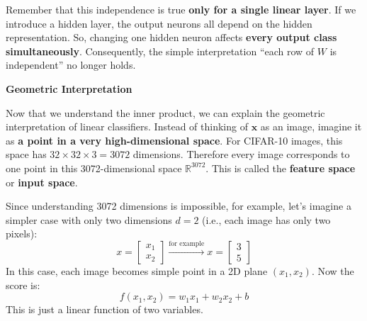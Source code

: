 \highspace
Remember that this independence is true \textbf{only for a single linear layer}. If we introduce a hidden layer, the output neurons all depend on the hidden representation. So, changing one hidden neuron affects \textbf{every output class simultaneously}. Consequently, the simple interpretation ``each row of $W$ is independent'' no longer holds.

\highspace
\begin{flushleft}
    \textcolor{Green3}{ \textbf{Geometric Interpretation}}
\end{flushleft}
Now that we understand the inner product, we can explain the geometric interpretation of linear classifiers. Instead of thinking of $\mathbf{x}$ as an image, imagine it as \textbf{a point in a very high-dimensional space}. For CIFAR-10 images, this space has $32 \times 32 \times 3 = 3072$ dimensions. Therefore every image corresponds to one point in this 3072-dimensional space $\mathbb{R}^{3072}$. This is called the \textbf{feature space} or \textbf{input space}.

\highspace
Since understanding 3072 dimensions is impossible, for example, let's imagine a simpler case with only two dimensions $d=2$ (i.e., each image has only two pixels):
\begin{equation*}
    x = \begin{bmatrix}
        x_1 \\
        x_2
    \end{bmatrix}
    \xrightarrow{\text{for example}}
    x = \begin{bmatrix}
        3 \\
        5
    \end{bmatrix}
\end{equation*}
In this case, each image becomes simple point in a 2D plane $\left(x_1, x_2\right)$. Now the score is:
\begin{equation*}
    f\left(x_1, x_2\right) = w_1 x_1 + w_2 x_2 + b
\end{equation*}
This is just a linear function of two variables.

